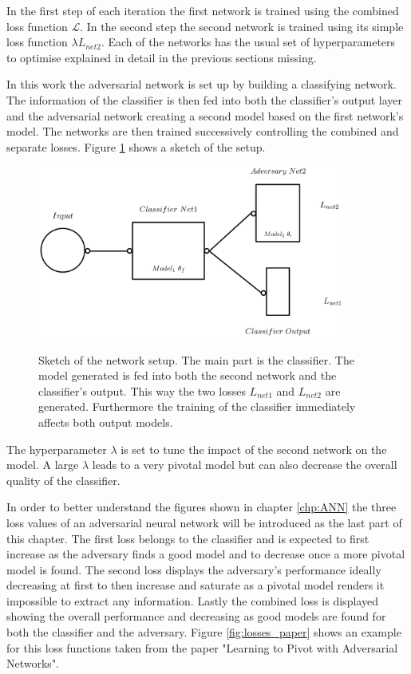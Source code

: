 In the first step of each iteration the first network is trained using the combined loss function $\mathcal{L}$. In the second step the second network is trained using its simple loss function $\lambda L_{net2}$. Each of the networks has the usual set of hyperparameters to optimise explained in detail in the previous sections missing.

In this work the adversarial network is set up by building a classifying network. The information of the classifier is then fed into both the classifier's output layer and the adversarial network creating a second model based on the first network's model. The networks are then trained successively controlling the combined and separate losses. Figure \ref{fig:ANN_sketch} shows a sketch of the setup.

\begin{figure}[htbp]
	\centering
	\includegraphics[width=0.9\textwidth]{figures_ML/ANN_sketch.png}
	\label{fig:ANN_sketch}
	\caption[Adversarial setup sketched]{Sketch of the network setup. The main part is the classifier. The model generated is fed into both the second network and the classifier's output. This way the two losses $L_{net1}$ and $L_{net2}$ are generated. Furthermore the training of the classifier immediately affects both output models.}
\end{figure}

The hyperparameter $\lambda$ is set to tune the impact of the second network on the model. A large $\lambda$ leads to a very pivotal model but can also decrease the overall quality of the classifier.

In order to better understand the figures shown in chapter \ref{chp:ANN} the three loss values of an adversarial neural network will be introduced as the last part of this chapter.
The first loss belongs to the classifier and is expected to first increase as the adversary finds a good model and to decrease once a more pivotal model is found. 
The second loss displays the adversary's performance ideally decreasing at first to then increase and saturate as a pivotal model renders it impossible to extract any information.
Lastly the combined loss is displayed showing the overall performance and decreasing as good models are found for both the classifier and the adversary.
Figure \ref{fig:losses_paper} shows an example for this loss functions taken from the paper "Learning to Pivot with Adversarial Networks".~\cite{Louppe:2016ylz}

